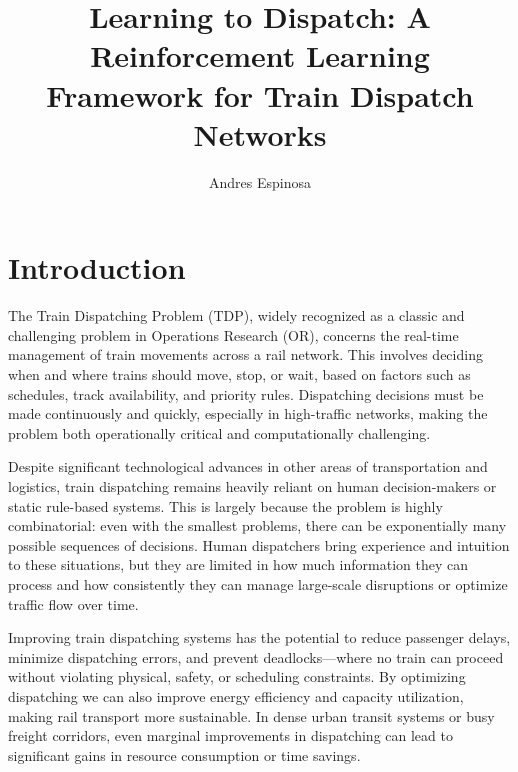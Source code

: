 \documentclass[runningheads]{llncs}
\begin{document}
\title{Learning to Dispatch: A Reinforcement Learning Framework for Train Dispatch Networks}
\titlerunning{\textcolor{uf_blue}{Learning to Dispatch}}

\author{\textcolor{uf_blue}{Andres Espinosa}}
\maketitle


\begin{abstract}

\end{abstract}



\section{Introduction}
\label{sse:introduction}

The Train Dispatching Problem (TDP), widely recognized as a classic and challenging problem in Operations Research (OR), concerns the real-time management of train movements across a rail network.
This involves deciding when and where trains should move, stop, or wait, based on factors such as schedules, track availability, and priority rules. 
Dispatching decisions must be made continuously and quickly, especially in high-traffic networks, making the problem both operationally critical and computationally challenging.

Despite significant technological advances in other areas of transportation and logistics, train dispatching remains heavily reliant on human decision-makers or static rule-based systems. 
This is largely because the problem is highly combinatorial: even with the smallest problems, there can be exponentially many possible sequences of decisions. 
Human dispatchers bring experience and intuition to these situations, but they are limited in how much information they can process and how consistently they can manage large-scale disruptions or optimize traffic flow over time.

Improving train dispatching systems has the potential to reduce passenger delays, minimize dispatching errors, and prevent deadlocks—where no train can proceed without violating physical, safety, or scheduling constraints. 
By optimizing dispatching we can also improve energy efficiency and capacity utilization, making rail transport more sustainable. 
In dense urban transit systems or busy freight corridors, even marginal improvements in dispatching can lead to significant gains in resource consumption or time savings.
\end{document}
